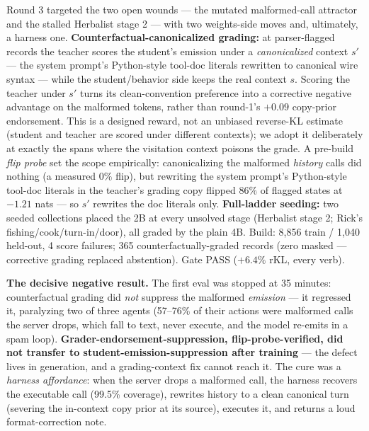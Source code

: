 \documentclass[11pt]{article}
\begin{document}
Round 3 targeted the two open wounds --- the mutated malformed-call attractor and the stalled
Herbalist stage 2 --- with two weights-side moves and, ultimately, a harness one.
\textbf{Counterfactual-canonicalized grading:} at parser-flagged records the teacher scores the
student's emission under a \emph{canonicalized} context $s'$ --- the system prompt's Python-style
tool-doc literals rewritten to canonical wire syntax --- while the student/behavior side keeps the
real context $s$. Scoring the teacher under $s'$ turns its clean-convention preference into a
corrective negative advantage on the malformed tokens, rather than round-1's $+0.09$ copy-prior
endorsement. This is a designed reward, not an unbiased reverse-KL estimate (student and teacher
are scored under different contexts); we adopt it deliberately at exactly the spans where the
visitation context poisons the grade. A pre-build \emph{flip probe} set the scope empirically:
canonicalizing the malformed \emph{history} calls did nothing (a measured $0\%$ flip), but
rewriting the system prompt's Python-style tool-doc literals in the teacher's grading copy flipped
$86\%$ of flagged states at $-1.21$ nats --- so $s'$ rewrites the doc literals only.
\textbf{Full-ladder seeding:} two seeded collections placed the 2B at every unsolved stage
(Herbalist stage 2; Rick's fishing/cook/turn-in/door), all graded by the plain 4B. Build:
8{,}856 train / 1{,}040 held-out, 4 score failures; 365 counterfactually-graded records (zero
masked --- corrective grading replaced abstention). Gate PASS ($+6.4\%$ rKL, every verb).

\textbf{The decisive negative result.} The first eval was stopped at 35 minutes:
counterfactual grading did \emph{not} suppress the malformed \emph{emission} --- it regressed it,
paralyzing two of three agents (57--76\% of their actions were malformed calls the server drops,
which fall to text, never execute, and the model re-emits in a spam loop).
\textbf{Grader-endorsement-suppression, flip-probe-verified, did not transfer to
student-emission-suppression after training} --- the defect lives in generation, and a
grading-context fix cannot reach it. The cure was a \emph{harness affordance}: when the server
drops a malformed call, the harness recovers the executable call (99.5\% coverage), rewrites
history to a clean canonical turn (severing the in-context copy prior at its source), executes
it, and returns a loud format-correction note.
\end{document}
